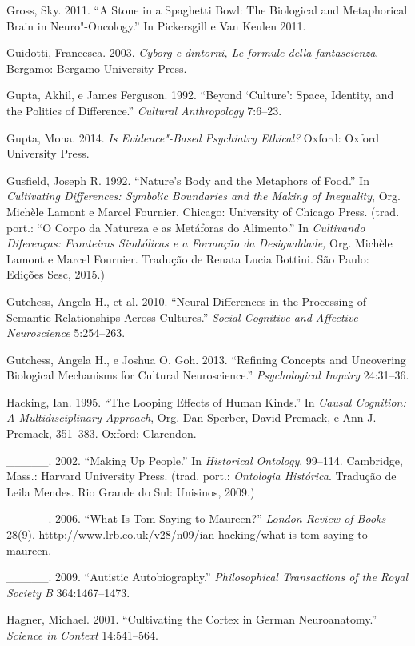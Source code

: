 {\begin{Parskip}
Gross, Sky. 2011. ``A Stone in a Spaghetti Bowl: The Biological and
Metaphorical Brain in Neuro"-Oncology.'' In Pickersgill e Van Keulen
2011.

Guidotti, Francesca. 2003. \emph{Cyborg e dintorni, Le formule della
fantascienza}. Bergamo: Bergamo University Press.

Gupta, Akhil, e James Ferguson. 1992. ``Beyond `Culture': Space,
Identity, and the Politics of Difference.'' \emph{Cultural Anthropology}
7:6--23.

Gupta, Mona. 2014. \emph{Is Evidence"-Based Psychiatry Ethical?} Oxford:
Oxford University Press.

Gusfield, Joseph R. 1992. ``Nature's Body and the Metaphors of Food.''
In \emph{Cultivating Differences: Symbolic Boundaries and the Making of
Inequality}, Org. Michèle Lamont e Marcel Fournier. Chicago: University
of Chicago Press. (trad. port.: ``O Corpo da Natureza e as Metáforas do
Alimento.'' In \emph{Cultivando Diferenças: Fronteiras Simbólicas e a
Formação da Desigualdade,} Org. Michèle Lamont e Marcel Fournier.
Tradução de Renata Lucia Bottini. São Paulo: Edições Sesc, 2015.)

Gutchess, Angela H., et al. 2010. ``Neural Differences in the Processing
of Semantic Relationships Across Cultures.'' \emph{Social Cognitive and
Affective Neuroscience} 5:254--263.

Gutchess, Angela H., e Joshua O. Goh. 2013. ``Refining Concepts and
Uncovering Biological Mechanisms for Cultural Neuroscience.''
\emph{Psychological Inquiry} 24:31--36.

Hacking, Ian. 1995. ``The Looping Effects of Human Kinds.'' In
\emph{Causal Cognition: A Multidisciplinary Approach}, Org. Dan Sperber,
David Premack, e Ann J. Premack, 351--383. Oxford: Clarendon.

\_\_\_\_\_. 2002. ``Making Up People.'' In \emph{Historical Ontology},
99--114. Cambridge, Mass.: Harvard University Press. (trad. port.:
\emph{Ontologia Histórica}. Tradução de Leila Mendes. Rio Grande do Sul:
Unisinos, 2009.)

\_\_\_\_\_. 2006. ``What Is Tom Saying to Maureen?'' \emph{London Review
of Books} 28(9).
htttp://www.lrb.co.uk/v28/n09/ian-hacking/what-is-tom-saying-to-maureen.

\_\_\_\_\_. 2009. ``Autistic Autobiography.'' \emph{Philosophical
Transactions of the Royal Society B} 364:1467--1473.

Hagner, Michael. 2001. ``Cultivating the Cortex in German
Neuroanatomy.'' \emph{Science in Context} 14:541--564.


\end{Parskip}}
